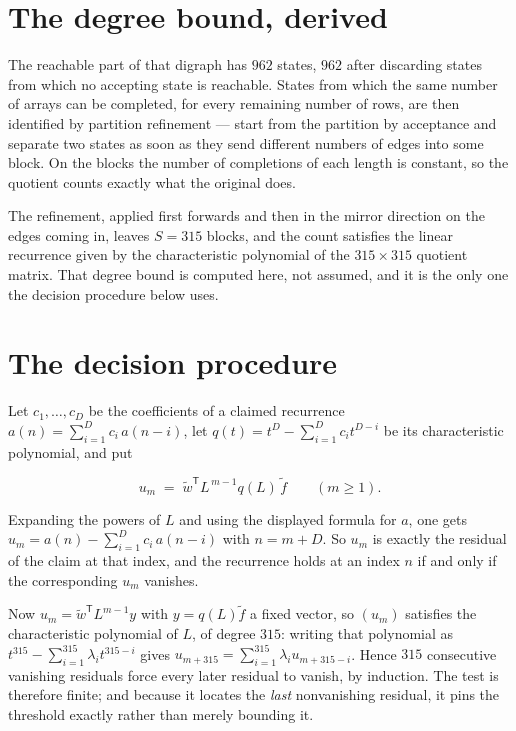 \documentclass[11pt]{article}
\theoremstyle{definition}
\begin{document}
\section{The degree bound, derived}

The reachable part of that digraph has $962$ states, $962$ after discarding states from which no accepting state is reachable. States from which the same number of arrays can be completed, for every remaining number of rows, are then identified by partition refinement --- start from the partition by acceptance and separate two states as soon as they send different numbers of edges into some block. On the blocks the number of completions of each length is constant, so the quotient counts exactly what the original does.

The refinement, applied first forwards and then in the mirror direction on the edges coming in, leaves $S = 315$ blocks, and the count satisfies the linear recurrence given by the characteristic polynomial of the $315 \times 315$ quotient matrix. That degree bound is computed here, not assumed, and it is the only one the decision procedure below uses.

\section{The decision procedure}

Let $c_1,\dots,c_D$ be the coefficients of a claimed recurrence $a(n) = \sum_{i=1}^{D} c_i\,a(n-i)$, let $q(t) = t^{D} - \sum_{i=1}^{D} c_i t^{D-i}$ be its characteristic polynomial, and put

\[u_m \;=\; \tilde w^{\mathsf T} L^{\,m-1} q(L)\,\tilde f \qquad (m \ge 1).\]

Expanding the powers of $L$ and using the displayed formula for $a$, one gets $u_m = a(n) - \sum_{i=1}^{D} c_i\,a(n-i)$ with $n = m + D$. So $u_m$ is exactly the residual of the claim at that index, and the recurrence holds at an index $n$ if and only if the corresponding $u_m$ vanishes.

Now $u_m = \tilde w^{\mathsf T} L^{m-1} y$ with $y = q(L)\tilde f$ a fixed vector, so $(u_m)$ satisfies the characteristic polynomial of $L$, of degree $315$: writing that polynomial as $t^{315} - \sum_{i=1}^{315} \lambda_i t^{315-i}$ gives $u_{m+315} = \sum_{i=1}^{315} \lambda_i u_{m+315-i}$. Hence $315$ consecutive vanishing residuals force every later residual to vanish, by induction. The test is therefore finite; and because it locates the {\itshape last} nonvanishing residual, it pins the threshold exactly rather than merely bounding it.
\end{document}
